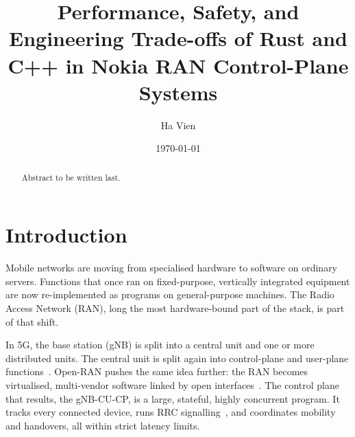 \documentclass[english,twoside,openright,a4paper,censored,csm,software-track-2020]{HYthesisML}
\title{Performance, Safety, and Engineering Trade-offs of Rust and C++ in Nokia RAN Control-Plane Systems}
\author{Ha Vien}
\date{\today}
\begin{document}
\maketitle


{\singlespacing
\begin{otherlanguage}{english}
\begin{abstract}
\noindent Abstract to be written last.
\end{abstract}
\end{otherlanguage}
}

\mytableofcontents

\mainmatter

\chapter{Introduction}

Mobile networks are moving from specialised hardware to software on ordinary servers.
Functions that once ran on fixed-purpose, vertically integrated equipment are now
re-implemented as programs on general-purpose machines. The Radio Access Network (RAN),
long the most hardware-bound part of the stack, is part of that shift.

In 5G, the base station (gNB) is split into a central unit and one or more distributed
units. The central unit is split again into control-plane and user-plane
functions~\cite{3gpp38401,3gpp38300}. Open-RAN pushes the same idea further: the RAN
becomes virtualised, multi-vendor software linked by open
interfaces~\cite{polese2023oran}. The control plane that results, the gNB-CU-CP, is a
large, stateful, highly concurrent program. It tracks every connected device, runs RRC
signalling~\cite{3gpp38331}, and coordinates mobility and handovers, all within strict
latency limits.
\end{document}
